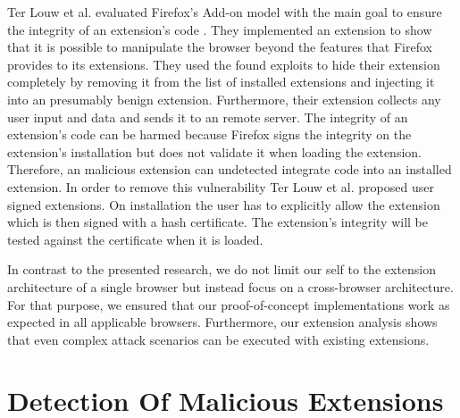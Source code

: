 	Ter Louw et al. evaluated Firefox's Add-on model with the main goal to ensure the integrity of an extension's code \cite{TerLouw:2007:EWB:1420581.1420583}. They implemented an extension to show that it is possible to manipulate the browser beyond the features that Firefox provides to its extensions. They used the found exploits to hide their extension completely by removing it from the list of installed extensions and injecting it into an presumably benign extension. Furthermore, their extension collects any user input and data and sends it to an remote server. The integrity of an extension's code can be harmed because Firefox signs the integrity on the extension's installation but does not validate it when loading the extension. Therefore, an malicious extension can undetected integrate code into an installed extension. In order to remove this vulnerability Ter Louw et al. proposed user signed extensions. On installation the user has to explicitly allow the extension which is then signed with a hash certificate. The extension's integrity will be tested against the certificate when it is loaded. 

	In contrast to the presented research, we do not limit our self to the extension architecture of a single browser but instead focus on a cross-browser architecture. For that purpose, we ensured that our proof-of-concept implementations work as expected in all applicable browsers. Furthermore, our extension analysis shows that even complex attack scenarios can be executed with existing extensions.
	
\section{Detection Of Malicious Extensions}
\label{sec:relatedWorks:detectionOfMaliciousExtensions} 
	
